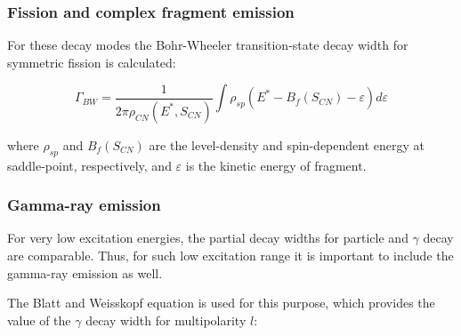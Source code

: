\subsubsection{Fission and complex fragment emission}

For these decay modes the Bohr-Wheeler transition-state decay width for symmetric fission is calculated:

\begin{equation}
	\Gamma_{BW}=\frac{1}{2\pi\rho_{CN}\left(E^*,S_{CN}\right)}\int \rho_{sp}\left(E^*-B_f\left(S_{CN}\right)-\varepsilon\right)d\varepsilon
\end{equation}

where $\rho_{sp}$ and $B_f(S_{CN})$ are the level-density  and spin-dependent energy at saddle-point, respectively, and 
$\varepsilon$ is the kinetic energy of  fragment.



\subsubsection{Gamma-ray emission}

For very low excitation energies, the partial decay widths for particle and $\gamma$ decay are comparable.
Thus, for such low excitation range it is important to include the gamma-ray emission 
as well.
 
The Blatt and Weisskopf equation is used for this purpose, which provides the value of the $\gamma$ decay width for multipolarity $l$:


